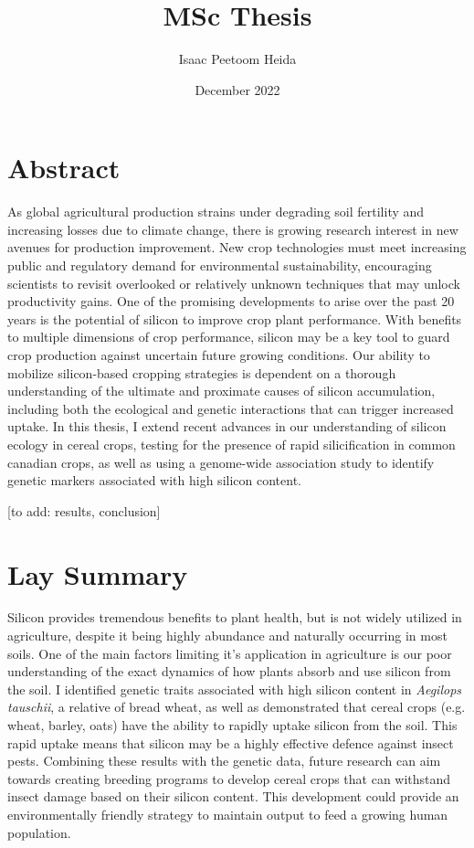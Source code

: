 \documentclass[12pt, letterpaper, ]{article}
\title{MSc Thesis}
\author{Isaac Peetoom Heida}
\date{December 2022}
\begin{document}


\tableofcontents

\section{Abstract}

As global agricultural production strains under degrading soil fertility and increasing losses due to climate change, there is growing research interest in new avenues for production improvement. New crop technologies must meet increasing public and regulatory demand for environmental sustainability, encouraging scientists to revisit overlooked or relatively unknown techniques that may unlock productivity gains. One of the promising developments to arise over the past 20 years is the potential of silicon to improve crop plant performance. With benefits to multiple dimensions of crop performance, silicon may be a key tool to guard crop production against uncertain future growing conditions. Our ability to mobilize silicon-based cropping strategies is dependent on a thorough understanding of the ultimate and proximate causes of silicon accumulation, including both the ecological and genetic interactions that can trigger increased uptake. In this thesis, I extend recent advances in our understanding of silicon ecology in cereal crops, testing for the presence of rapid silicification in common canadian crops, as well as using a  genome-wide association study to identify genetic markers associated with high silicon content. 

[to add: results, conclusion]

\section{Lay Summary}

Silicon provides tremendous benefits to plant health, but is not widely utilized in agriculture, despite it being highly abundance and naturally occurring in most soils. One of the main factors limiting it's application in agriculture is our poor understanding of the exact dynamics of how plants absorb and use silicon from the soil. I identified genetic traits associated with high silicon content in \textit{Aegilops tauschii}, a relative of bread wheat, as well as demonstrated that cereal crops (e.g. wheat, barley, oats) have the ability to rapidly uptake silicon from the soil. This rapid uptake means that silicon may be a highly effective defence against insect pests. Combining these results with the genetic data, future research can aim towards creating breeding programs to develop cereal crops that can withstand insect damage based on their silicon content. This development could provide an environmentally friendly strategy to maintain output to feed a growing human population.
\end{document}
